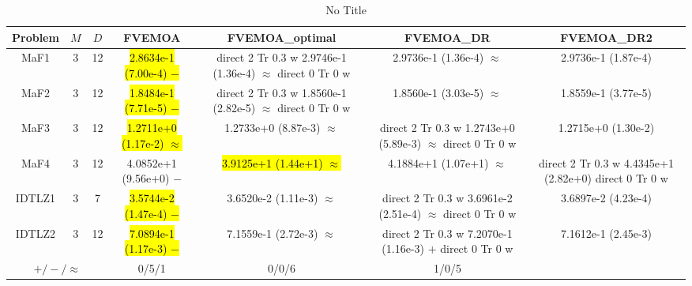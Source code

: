 \documentclass[journal]{IEEEtran}
\newcommand{\semitextbf}[1]{%
\pdfliteral direct {2 Tr 0.3 w} %
#1%
\pdfliteral direct {0 Tr 0 w}%
}
\begin{document}
\begin{table*}[htbp]
\renewcommand{\arraystretch}{1.2}
\centering
\caption{No Title}
\begin{tabular}{ccccccc}
\toprule
Problem&$M$&$D$&FVEMOA&FVEMOA\_optimal&FVEMOA\_DR&FVEMOA\_DR2\\
\midrule
\multirow{1}{*}{MaF1}&3&12&\hl{2.8634e-1 (7.00e-4) $-$}&\semitextbf{2.9746e-1 (1.36e-4) $\approx$}&2.9736e-1 (1.36e-4) $\approx$&2.9736e-1 (1.87e-4)\\
\hline
\multirow{1}{*}{MaF2}&3&12&\hl{1.8484e-1 (7.71e-5) $-$}&\semitextbf{1.8560e-1 (2.82e-5) $\approx$}&1.8560e-1 (3.03e-5) $\approx$&1.8559e-1 (3.77e-5)\\
\hline
\multirow{1}{*}{MaF3}&3&12&\hl{1.2711e+0 (1.17e-2) $\approx$}&1.2733e+0 (8.87e-3) $\approx$&\semitextbf{1.2743e+0 (5.89e-3) $\approx$}&1.2715e+0 (1.30e-2)\\
\hline
\multirow{1}{*}{MaF4}&3&12&4.0852e+1 (9.56e+0) $-$&\hl{3.9125e+1 (1.44e+1) $\approx$}&4.1884e+1 (1.07e+1) $\approx$&\semitextbf{4.4345e+1 (2.82e+0)}\\
\hline
\multirow{1}{*}{IDTLZ1}&3&7&\hl{3.5744e-2 (1.47e-4) $-$}&3.6520e-2 (1.11e-3) $\approx$&\semitextbf{3.6961e-2 (2.51e-4) $\approx$}&3.6897e-2 (4.23e-4)\\
\hline
\multirow{1}{*}{IDTLZ2}&3&12&\hl{7.0894e-1 (1.17e-3) $-$}&7.1559e-1 (2.72e-3) $\approx$&\semitextbf{7.2070e-1 (1.16e-3) $+$}&7.1612e-1 (2.45e-3)\\
\hline
\multicolumn{3}{c}{$+/-/\approx$}&0/5/1&0/0/6&1/0/5&\\
\bottomrule
\end{tabular}
\label{No Label}
\end{table*}
\end{document}
